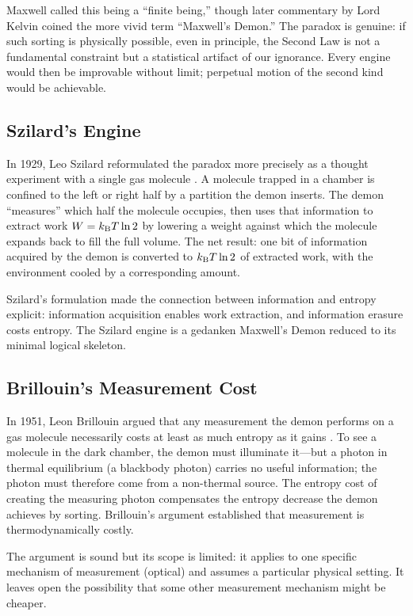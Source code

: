 Maxwell called this being a ``finite being,'' though later commentary by Lord
Kelvin coined the more vivid term ``Maxwell's Demon.'' The paradox is genuine:
if such sorting is physically possible, even in principle, the Second Law is
not a fundamental constraint but a statistical artifact of our ignorance. Every
engine would then be improvable without limit; perpetual motion of the second
kind would be achievable.

\subsection{Szilard's Engine}

In 1929, Leo Szilard reformulated the paradox more precisely as a thought
experiment with a single gas molecule \citep{szilard1929}. A molecule trapped
in a chamber is confined to the left or right half by a partition the demon
inserts. The demon ``measures'' which half the molecule occupies, then uses
that information to extract work $W = k_{\mathrm{B}} T \ln 2$ by lowering a weight
against which the molecule expands back to fill the full volume. The net result:
one bit of information acquired by the demon is converted to $k_{\mathrm{B}} T \ln 2$
of extracted work, with the environment cooled by a corresponding amount.

Szilard's formulation made the connection between information and entropy
explicit: information acquisition enables work extraction, and information
erasure costs entropy. The Szilard engine is a gedanken Maxwell's Demon
reduced to its minimal logical skeleton.

\subsection{Brillouin's Measurement Cost}

In 1951, Leon Brillouin argued that any measurement the demon performs on a
gas molecule necessarily costs at least as much entropy as it gains
\citep{brillouin1951}. To see a molecule in the dark chamber, the demon must
illuminate it---but a photon in thermal equilibrium (a blackbody photon)
carries no useful information; the photon must therefore come from a non-thermal
source. The entropy cost of creating the measuring photon compensates the entropy
decrease the demon achieves by sorting. Brillouin's argument established that
measurement is thermodynamically costly.

The argument is sound but its scope is limited: it applies to one specific
mechanism of measurement (optical) and assumes a particular physical setting.
It leaves open the possibility that some other measurement mechanism might be
cheaper.


